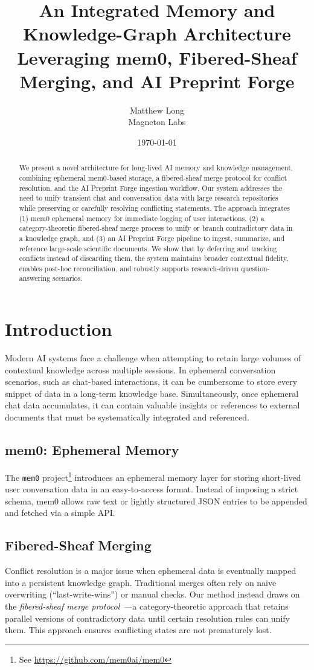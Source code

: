\documentclass[11pt]{article}
\title{An Integrated Memory and Knowledge-Graph Architecture \\
       Leveraging mem0, Fibered-Sheaf Merging, and AI Preprint Forge}
\author{Matthew Long \\
Magneton Labs}
\date{\today}
\begin{document}
\maketitle

\begin{abstract}
We present a novel architecture for long-lived AI memory and knowledge management,
combining ephemeral mem0-based storage, a fibered-sheaf merge protocol for conflict
resolution, and the AI Preprint Forge ingestion workflow. Our system addresses the need
to unify transient chat and conversation data with large research repositories while
preserving or carefully resolving conflicting statements. The approach integrates
(1) mem0 ephemeral memory for immediate logging of user interactions, (2) a
category-theoretic fibered-sheaf merge process to unify or branch contradictory
data in a knowledge graph, and (3) an AI Preprint Forge pipeline to ingest,
summarize, and reference large-scale scientific documents. We show that by deferring
and tracking conflicts instead of discarding them, the system maintains broader
contextual fidelity, enables post-hoc reconciliation, and robustly supports
research-driven question-answering scenarios.
\end{abstract}

\section{Introduction}
Modern AI systems face a challenge when attempting to retain large volumes of
contextual knowledge across multiple sessions. In ephemeral conversation scenarios,
such as chat-based interactions, it can be cumbersome to store every snippet of
data in a long-term knowledge base. Simultaneously, once ephemeral chat data accumulates,
it can contain valuable insights or references to external documents that must be
systematically integrated and referenced.

\subsection{mem0: Ephemeral Memory}
The \texttt{mem0} project\footnote{See \url{https://github.com/mem0ai/mem0}} introduces
an ephemeral memory layer for storing short-lived user conversation data in an easy-to-access
format. Instead of imposing a strict schema, mem0 allows raw text or lightly structured
JSON entries to be appended and fetched via a simple API.

\subsection{Fibered-Sheaf Merging}
Conflict resolution is a major issue when ephemeral data is eventually mapped into
a persistent knowledge graph. Traditional merges often rely on naive overwriting
(``last-write-wins'') or manual checks. Our method instead draws on the
\textit{fibered-sheaf merge protocol}~\cite{FiberedSheaf2025}—a category-theoretic
approach that retains parallel versions of contradictory data until certain resolution
rules can unify them. This approach ensures conflicting states are not prematurely lost.
\end{document}
